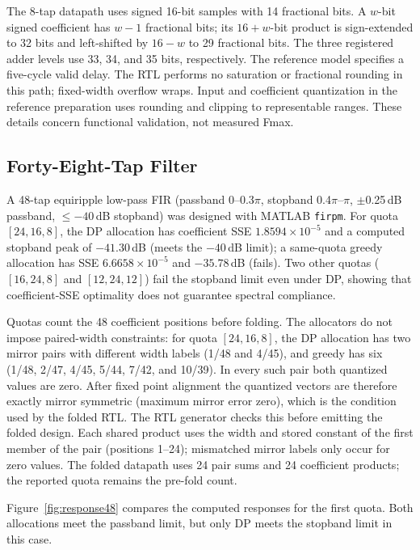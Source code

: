 The 8-tap datapath uses signed 16-bit samples with 14 fractional bits.
A $w$-bit signed coefficient has $w-1$ fractional bits; its $16+w$-bit
product is sign-extended to 32 bits and left-shifted by $16-w$ to
29 fractional bits. The three registered adder levels use 33, 34, and
35 bits, respectively. The reference model specifies a five-cycle valid
delay. The RTL performs no saturation or fractional rounding in this
path; fixed-width overflow wraps. Input and coefficient quantization
in the reference preparation uses rounding and clipping to representable
ranges. These details concern functional validation, not measured Fmax.

\subsection{Forty-Eight-Tap Filter}

A 48-tap equiripple low-pass FIR (passband 0--0.3$\pi$, stopband
0.4$\pi$--$\pi$, $\pm$0.25\,dB passband, $\le -40$\,dB stopband) was
designed with MATLAB \texttt{firpm}. For quota $[24,16,8]$, the DP
allocation has coefficient SSE $1.8594 \times 10^{-5}$ and a computed
stopband peak of $-41.30$\,dB (meets the $-40$\,dB limit); a same-quota
greedy allocation has SSE $6.6658 \times 10^{-5}$ and $-35.78$\,dB
(fails). Two other quotas ($[16,24,8]$ and $[12,24,12]$) fail the
stopband limit even under DP, showing that coefficient-SSE optimality
does not guarantee spectral compliance.

Quotas count the 48 coefficient positions before folding. The allocators
do not impose paired-width constraints: for quota $[24,16,8]$, the DP
allocation has two mirror pairs with different width labels (1/48 and
4/45), and greedy has six (1/48, 2/47, 4/45, 5/44, 7/42, and 10/39).
In every such pair both quantized values are zero. After fixed
point alignment the quantized vectors are therefore exactly mirror
symmetric (maximum mirror error zero), which is the condition used by
the folded RTL. The RTL generator checks this before emitting the folded
design. Each shared product uses the width and stored constant of the
first member of the pair (positions 1--24); mismatched mirror labels
only occur for zero values. The folded datapath uses 24 pair sums and 24 coefficient
products; the reported quota remains the pre-fold count.

Figure~\ref{fig:response48} compares the computed responses for the first
quota. Both allocations meet the passband limit, but only DP meets the
stopband limit in this case.

